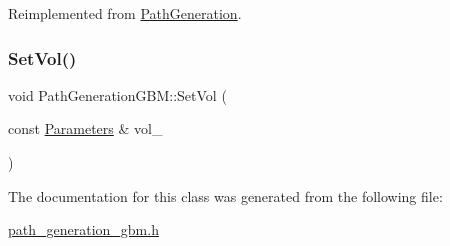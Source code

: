 Reimplemented from \hyperlink{classPathGeneration_afc14af2b771829ca2581463e4e4c1213}{Path\+Generation}.

\hypertarget{classPathGenerationGBM_af1212fa64fcb9a97be42b4482ff51b65}{}\label{classPathGenerationGBM_af1212fa64fcb9a97be42b4482ff51b65} 
\subsubsection{\texorpdfstring{Set\+Vol()}{SetVol()}}
{\footnotesize\ttfamily void Path\+Generation\+G\+B\+M\+::\+Set\+Vol (\begin{DoxyParamCaption}\item[{const \hyperlink{classParameters}{Parameters} \&}]{vol\+\_\+ }\end{DoxyParamCaption})}



The documentation for this class was generated from the following file\+:\begin{DoxyCompactItemize}
\item 
\hyperlink{path__generation__gbm_8h}{path\+\_\+generation\+\_\+gbm.\+h}\end{DoxyCompactItemize}
